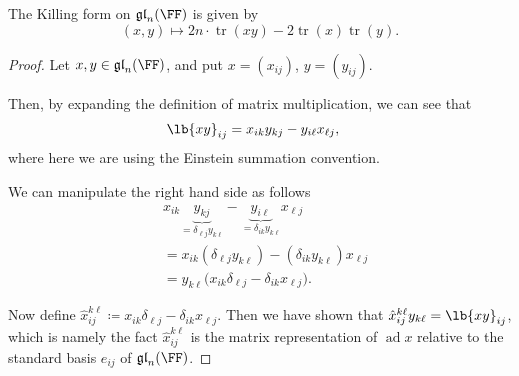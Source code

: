 \documentclass{article}
\DeclarePairedDelimiter\lb\lbrack\rbrack
\DeclareMathOperator{\tr}{tr}
\newcommand*\ad{\operatorname{ad}}
\newcommand*\gl{\ensuremath{\mathfrak{gl}}}
\begin{document}
\begin{theorem}
    The Killing form on $\gl_n(\FF)$ is given by
    \[
        (x, y)
        \mapsto
        2n\cdot\tr(xy) - 2\tr(x)\tr(y).
    \]
\end{theorem}
\begin{proof}
    Let $x, y \in \gl_n(\FF)$, and put $x = (x_{ij})$, $y = (y_{ij})$.

    Then, by expanding the definition of matrix multiplication, we can see that
    \begin{align*}
        \lb{xy}_{ij}
        &=
        x_{ik}
        y_{kj}
        -
        y_{i\ell}x_{\ell j},
    \end{align*}
    where here we are using the Einstein summation convention.

    We can manipulate the right hand side as follows
    \begin{align*}
        &
        x_{ik}
        \underbrace{y_{kj}}_{=\delta_{\ell j}y_{k\ell}}
        -
        \underbrace{y_{i\ell}}_{=\delta_{ik}y_{k\ell}}
        x_{\ell j}
        \\
        &=
        x_{ik}
        (\delta_{\ell j}y_{k\ell})
        -
        (\delta_{ik}y_{k\ell})
        x_{\ell j}
        \\
        &=
        y_{k\ell}
        \Big(
            x_{ik}\delta_{\ell j}
            -
            \delta_{ik}x_{\ell j}
        \Big).
    \end{align*}

    Now define $\hat{x}_{ij}^{k\ell} \coloneq x_{ik}\delta_{\ell j} - \delta_{ik} x_{\ell j}$.
    Then we have shown that $\hat{x}_{ij}^{k\ell} y_{k\ell} = \lb{xy}_{ij}$, which is namely the fact $\hat{x}_{ij}^{k\ell}$ is the matrix representation of $\ad x$ relative to the standard basis $e_{ij}$ of $\gl_n(\FF)$.


\end{proof}
\end{document}

